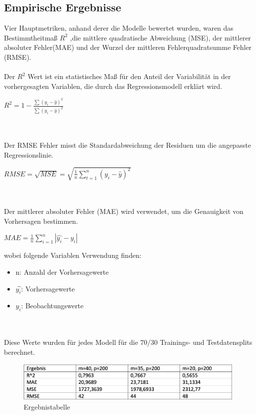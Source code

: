 \documentclass[12pt]{article}
\begin{document}
\begin{text}
\newpage
\part{Empirische Ergebnisse}
Vier Hauptmetriken, anhand derer die Modelle bewertet wurden, waren das Bestimmtheitmaß $R^2$ ,die mittlere quadratische Abweichung (MSE), der mittlerer absoluter Fehler(MAE) und der Wurzel der mittleren Fehlerquadratsumme Fehler (RMSE).
\\\\
Der $R^2$ Wert ist ein statistisches Maß für den Anteil der Variabilität in der vorhergesagten Variablen, die durch das Regressionsmodell erklärt wird.
\begin{center}
    $R^2 = 1- \frac{\sum{(y_i-\hat{y})^2}}{\sum{(y_i-\bar{y})^2}}$
\end{center}
\\\\
Der RMSE Fehler misst die Standardabweichung der Residuen um die angepasste Regressionslinie.
\begin{center}
    $RMSE= \sqrt{MSE} = \sqrt{{\frac{1}{n}}\sum\limits_{t=1}^{n}{(y_i-\hat{y})^2}}$
\end{center}
\\\\
Der mittlerer absoluter Fehler (MAE) wird verwendet, um die Genauigkeit von Vorhersagen bestimmen.
\begin{center}
    $MAE = \frac{1}{n}\sum\limits_{i=1}^{n}{|\hat{y_i}-y_i|}$
\end{center}
wobei folgende Variablen Verwendung finden:
\begin{itemize}
    \item n: Anzahl der Vorhersagewerte
    \item $\hat{y_i}$: Vorhersagewerte
    \item $y_i$: Beobachtungswerte
\end{itemize}
\\\\
\newpage
Diese Werte wurden für jedes Modell für die 70/30 Trainings- und Testdatensplits berechnet.\\
\begin{figure}[h]
 \includegraphics[width=1\textwidth]{Ergebnisse.png}
 \caption{Ergebnistabelle}
\end{figure}


\end{text}
\end{document}
